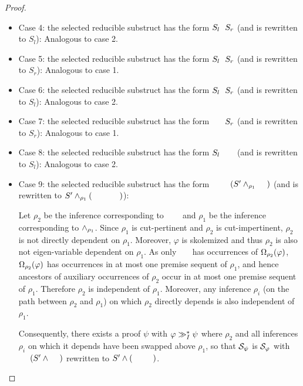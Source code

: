 \documentclass{llncs}
\begin{document}
\begin{proof}
\begin{itemize}
	\item Case 4: the selected reducible substruct has the form $S_l \hF{\structtimes} S_r$ (and is rewritten to $S_l$): Analogous to case 2.

	\item Case 5: the selected reducible substruct has the form $S_l \hF{\structplus} S_r$ (and is rewritten to $S_r$): Analogous to case 1.

	\item Case 6: the selected reducible substruct has the form $S_l \hF{\structplus} S_r$ (and is rewritten to $S_l$): Analogous to case 2.

	\item Case 7: the selected reducible substruct has the form $\hF{S_l} \hF{\structplus} S_r$ (and is rewritten to $S_r$): Analogous to case 1.

	\item Case 8: the selected reducible substruct has the form $S_l \hF{\structplus} \hF{S_r}$ (and is rewritten to $S_l$): Analogous to case 2.

	\item Case 9: the selected reducible substruct has the form $\hF{S} \hF{\structtimes_{\rho_2}} (S' \structplus_{\rho_1} \hF{S''})$ (and is rewritten to $S' \structplus_{\rho_1} (\hF{S} \hF{\structtimes_{\rho_2}} \hF{S''})$):

Let $\rho_2$ be the inference corresponding to $\hF{\structtimes_{\rho_2}}$ and $\rho_1$ be the inference corresponding to $\wedge_{\rho_1}$. Since $\rho_1$ is cut-pertinent and $\rho_2$ is cut-impertinent, $\rho_2$ is not directly dependent on $\rho_1$. Moreover, $\varphi$ is skolemized and thus $\rho_2$ is also not eigen-variable dependent on $\rho_1$. As only $\hF{S''}$ has occurrences of $\Omega_{\rho_2}(\varphi)$, $\Omega_{\rho_2}(\varphi)$ has occurrences in at most one premise sequent of $\rho_1$, and hence ancestors of auxiliary occurrences of $\rho_2$ occur in at most one premise sequent of $\rho_1$. Therefore $\rho_2$ is independent of $\rho_1$. Moreover, any inference $\rho_i$ (on the path between $\rho_2$ and $\rho_1$) on which $\rho_2$ directly depends is also independent of $\rho_1$.

Consequently, there exists a proof $\psi$ with $\varphi \gg_I^* \psi$ where $\rho_2$ and all inferences $\rho_i$ on which it depends have been swapped above $\rho_1$, so that $\mathcal{S}_{\psi}$ is $\mathcal{S}_{\varphi}$ with $\hF{S} \hF{\structtimes} (S' \structplus \hF{S''})$ rewritten to $S' \structplus (\hF{S} \hF{\structtimes} \hF{S''})$.



\end{itemize}
\end{proof}
\end{document}

